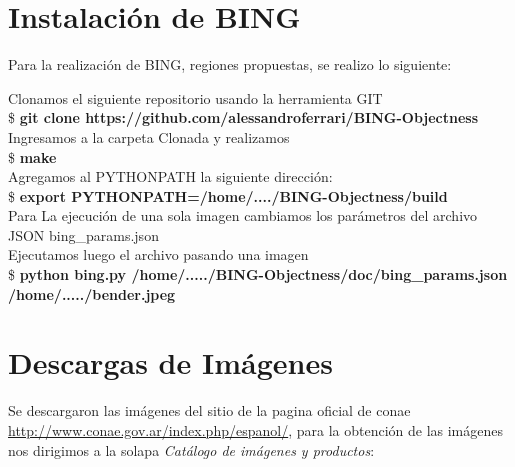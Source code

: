 
\section{Instalación de BING}
Para la realización de BING, regiones propuestas, se realizo lo siguiente:

Clonamos el siguiente repositorio usando la herramienta GIT\\
\$\textbf{ git clone https://github.com/alessandroferrari/BING-Objectness}
Ingresamos a la carpeta Clonada y realizamos \\
\$ \textbf{make} \\
Agregamos al PYTHONPATH la siguiente dirección:\\
\$ \textbf{export PYTHONPATH=/home/..../BING-Objectness/build} \\

Para La ejecución de una sola imagen cambiamos los parámetros del archivo JSON bing\_params.json \\
Ejecutamos luego el archivo pasando una imagen\\
\$ \textbf{python bing.py /home/...../BING-Objectness/doc/bing\_params.json /home/...../bender.jpeg}

\section{Descargas de Imágenes}
Se descargaron las imágenes del sitio de la pagina oficial de \ac{conae} \url{http://www.conae.gov.ar/index.php/espanol/}, para la obtención de las imágenes nos dirigimos a
la solapa \textit{Catálogo de imágenes y productos}:

